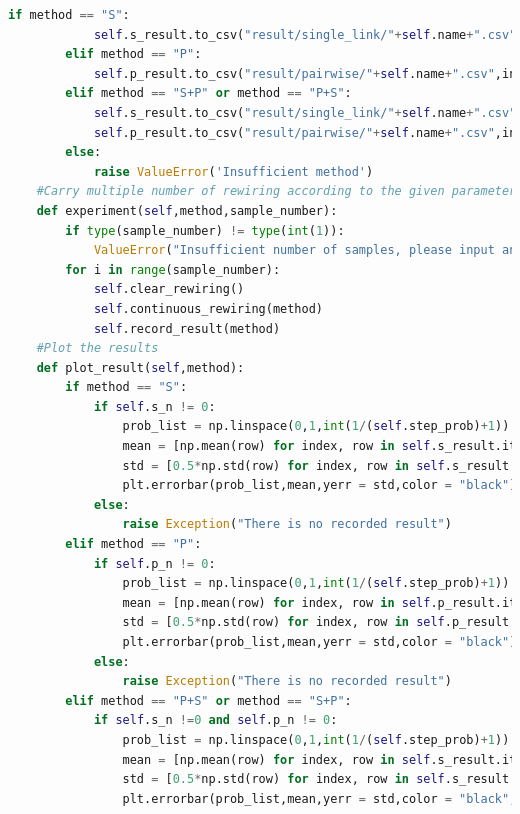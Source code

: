 \documentclass[12pt]{article}
\begin{document}
{\begin{lstlisting}[breaklines=true,language=Python]
        if method == "S":
            self.s_result.to_csv("result/single_link/"+self.name+".csv",index = False)
        elif method == "P":
            self.p_result.to_csv("result/pairwise/"+self.name+".csv",index = False)
        elif method == "S+P" or method == "P+S":
            self.s_result.to_csv("result/single_link/"+self.name+".csv",index = False)
            self.p_result.to_csv("result/pairwise/"+self.name+".csv",index = False)
        else:
            raise ValueError('Insufficient method')
    #Carry multiple number of rewiring according to the given parameter
    def experiment(self,method,sample_number):
        if type(sample_number) != type(int(1)):
            ValueError("Insufficient number of samples, please input an integer.")        
        for i in range(sample_number):
            self.clear_rewiring()
            self.continuous_rewiring(method)            
            self.record_result(method)
    #Plot the results
    def plot_result(self,method):
        if method == "S":
            if self.s_n != 0:
                prob_list = np.linspace(0,1,int(1/(self.step_prob)+1))
                mean = [np.mean(row) for index, row in self.s_result.iterrows()]
                std = [0.5*np.std(row) for index, row in self.s_result.iterrows()]
                plt.errorbar(prob_list,mean,yerr = std,color = "black")
            else:
                raise Exception("There is no recorded result")
        elif method == "P":
            if self.p_n != 0:
                prob_list = np.linspace(0,1,int(1/(self.step_prob)+1))
                mean = [np.mean(row) for index, row in self.p_result.iterrows()]
                std = [0.5*np.std(row) for index, row in self.p_result.iterrows()]
                plt.errorbar(prob_list,mean,yerr = std,color = "black")
            else:
                raise Exception("There is no recorded result")
        elif method == "P+S" or method == "S+P":
            if self.s_n !=0 and self.p_n != 0:
                prob_list = np.linspace(0,1,int(1/(self.step_prob)+1))
                mean = [np.mean(row) for index, row in self.s_result.iterrows()]
                std = [0.5*np.std(row) for index, row in self.s_result.iterrows()]
                plt.errorbar(prob_list,mean,yerr = std,color = "black",label = "Single link rewiring")
                

\end{lstlisting}}
\end{document}
